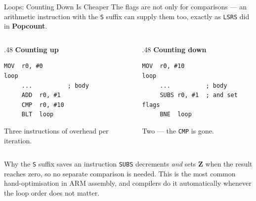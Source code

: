 \documentclass[9pt,aspectratio=169,xcolor=table]{beamer}
\begin{document}
\begin{frame}[fragile]{Loops: Counting Down Is Cheaper}
    \leavevmode
    {\small The flags are not only for comparisons --- an arithmetic
    instruction with the \texttt{S} suffix can supply them too, exactly
    as \texttt{LSRS} did in \textbf{Popcount}.}

    \vspace{1mm}
    \begin{columns}[T]
    \begin{column}{.48\textwidth}
        \textbf{Counting up}

        \vspace{1mm}
        \begin{lstlisting}[style=armasm, language=ARM, basicstyle=\ttfamily\small]
     MOV  r0, #0
loop
     ...          ; body
     ADD  r0, #1
     CMP  r0, #10
     BLT  loop
        \end{lstlisting}

        \vspace{3mm}
        {\small \alert{Three} instructions of overhead per iteration.}
    \end{column}
    \begin{column}{.48\textwidth}
        \textbf{Counting down}

        \vspace{1mm}
        \begin{lstlisting}[style=armasm, language=ARM, basicstyle=\ttfamily\small]
     MOV  r0, #10
loop
     ...          ; body
     SUBS r0, #1  ; and set flags
     BNE  loop
        \end{lstlisting}

        \vspace{3mm}
        {\small \alert{Two} --- the \texttt{CMP} is gone.}
    \end{column}
    \end{columns}

    \vspace{2mm}
    \begin{block}{Why the \texttt{S} suffix saves an instruction}
        \texttt{SUBS} decrements \emph{and} sets \textbf{Z} when the
        result reaches zero, so no separate comparison is needed. This
        is the most common hand-optimisation in ARM assembly, and
        compilers do it automatically whenever the loop order does not
        matter.
    \end{block}
\end{frame}
\end{document}
